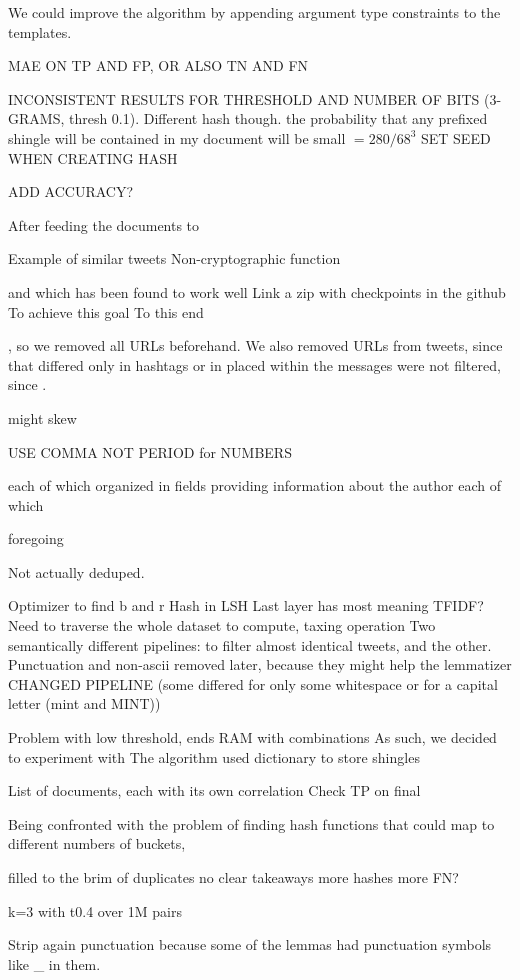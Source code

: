 \documentclass[runningheads]{llncs}
\begin{document}
We could improve the algorithm by appending argument type constraints to the templates.

MAE ON TP AND FP, OR ALSO TN AND FN

INCONSISTENT RESULTS FOR THRESHOLD AND NUMBER OF BITS (3-GRAMS, thresh 0.1). Different hash though.
the probability that any prefixed shingle will be contained in my document will be small $= 280 / 68^3$
SET SEED WHEN CREATING HASH

ADD ACCURACY?

After feeding the documents to 

Example of similar tweets
Non-cryptographic function

and which has been found to work well  
Link a zip with checkpoints in the github
To achieve this goal
To this end

, so we removed all URLs 
beforehand. 
We also removed URLs from tweets, since that differed only in hashtags or in  placed within the messages were not filtered, since . 

might skew

USE COMMA NOT PERIOD for NUMBERS

each of which organized in fields providing information about the author
each of which  

foregoing

Not actually deduped.

Optimizer to find b and r
Hash in LSH
Last layer has most meaning
TFIDF? Need to traverse the whole dataset to compute, taxing operation
Two semantically different pipelines: to filter almost identical tweets, and the other.
Punctuation and non-ascii removed later, because they might help the lemmatizer
CHANGED PIPELINE (some differed for only some whitespace or for a capital letter (mint and MINT))

Problem with low threshold, ends RAM with combinations
As such, we decided to experiment with   
The algorithm 
used dictionary to store shingles 

List of documents, each with its own correlation
Check TP on final


Being confronted with the problem of finding hash functions that could map to different numbers of buckets,

filled to the brim of duplicates
no clear takeaways
more hashes more FN?

k=3 with t0.4 over 1M pairs

Strip again punctuation because some of the lemmas had punctuation symbols like \_ in them.
\end{document}
